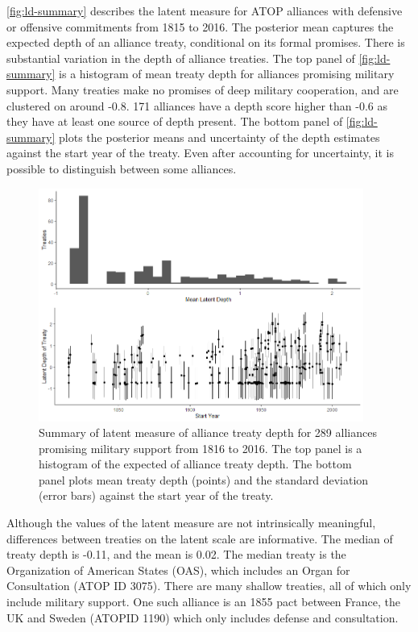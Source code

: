 \documentclass[12pt]{article}
\begin{document}
\autoref{fig:ld-summary} describes the latent measure for ATOP alliances with defensive or offensive commitments from 1815 to 2016.
The posterior mean captures the expected depth of an alliance treaty, conditional on its formal promises. 
There is substantial variation in the depth of alliance treaties. 
The top panel of \autoref{fig:ld-summary} is a histogram of mean treaty depth for alliances promising military support.  
Many treaties make no promises of deep military cooperation, and are clustered on around -0.8.  
171 alliances have a depth score higher than -0.6 as they have at least one source of depth present. 
The bottom panel of \autoref{fig:ld-summary} plots the posterior means and uncertainty of the depth estimates against the start year of the treaty. 
Even after accounting for uncertainty, it is possible to distinguish between some alliances. 


\begin{figure}
	\centering
		\includegraphics[width=0.95\textwidth]{../figures/ld-summary.png}
	\caption{Summary of latent measure of alliance treaty depth for 289 alliances promising military support from 1816 to 2016. The top panel is a histogram of the expected of alliance treaty depth. The bottom panel plots mean treaty depth (points) and the standard deviation (error bars) against the start year of the treaty.}
	\label{fig:ld-summary}
\end{figure}


Although the values of the latent measure are not intrinsically meaningful, differences between treaties on the latent scale are informative. 
The median of treaty depth is -0.11, and the mean is 0.02. 
The median treaty is the Organization of American States (OAS), which includes an Organ for Consultation (ATOP ID 3075). 
There are many shallow treaties, all of which only include military support. 
One such alliance is an 1855 pact between France, the UK and Sweden (ATOPID 1190) which only includes defense and consultation. 
\end{document}
